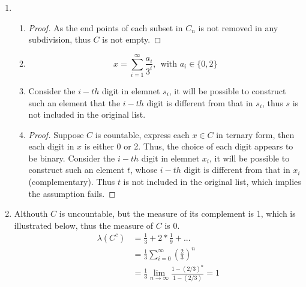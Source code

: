 \documentclass[paper=a4, fontsize=11pt]{scrartcl} %
\numberwithin{equation}{section} %
\numberwithin{figure}{section} %
\numberwithin{table}{section} %
\begin{document}
\begin{enumerate}
\begin{enumerate}
\begin{proof}
					\end{proof}
			\end{enumerate}
		\item 
			\begin{enumerate}
				\item 
					\begin{proof}
						As the end points of each subset in $C_n$ is not removed in any subdivision, thus $C$ is not empty.
					\end{proof}
				\item 
					\begin{equation}
						x = \sum_{i=1}^{\infty} \frac{a_i}{3^i}, \ \ \text{with $a_i \in \{0, 2\}$}
					\end{equation}
				\item 
					Consider the $i-th$ digit in elemnet $s_i$, it will be possible to construct such an element that the $i-th$ digit is different from that in $s_i$, thus $s$ is not included in the original list.
				\item 
					\begin{proof}
						Suppose $C$ is countable, express each $x \in C$ in ternary form, then each digit in $x$ is either 0 or 2. Thus, the choice of each digit appears to be binary. Consider the $i-th$ digit in elemnet $x_i$, it will be possible to construct such an element $t$, whose $i-th$ digit is different from that in $x_i$(complementary). Thus $t$ is not included in the original list, which implies the assumption fails.
					\end{proof}
			\end{enumerate}
		
		\item 
			Althouth $C$ is uncountable, but the measure of its complement is 1, which is illustrated below, thus the measure of $C$ is 0.		
			\begin{equation}
				\begin{aligned}
					\lambda(C^c) & = \frac{1}{3} + 2 * \frac{1}{9} + ... \\
					             & = \frac{1}{3}\sum_{i=0}^{\infty} (\frac{2}{3})^n\\
					             & = \frac{1}{3} \lim\limits_{n\rightarrow\infty}\frac{1-(2/3)^n}{1-(2/3)} = 1
          		\end{aligned}
			\end{equation} 
		
	\end{enumerate}


\end{document}
